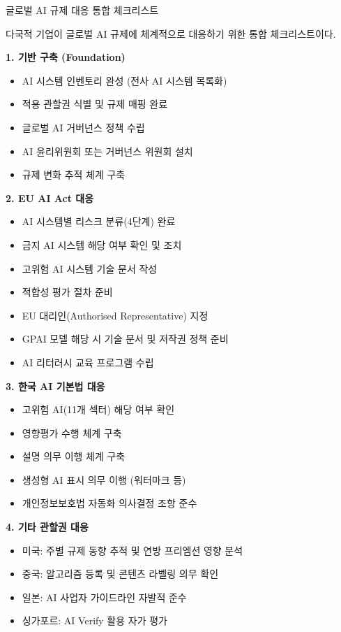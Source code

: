 \begin{practicaltool}{글로벌 AI 규제 대응 통합 체크리스트}

다국적 기업이 글로벌 AI 규제에 체계적으로 대응하기 위한 통합 체크리스트이다.

\textbf{1. 기반 구축 (Foundation)}
\begin{itemize}
 \item[$\square$] AI 시스템 인벤토리 완성 (전사 AI 시스템 목록화)
 \item[$\square$] 적용 관할권 식별 및 규제 매핑 완료
 \item[$\square$] 글로벌 AI 거버넌스 정책 수립
 \item[$\square$] AI 윤리위원회 또는 거버넌스 위원회 설치
 \item[$\square$] 규제 변화 추적 체계 구축
\end{itemize}

\textbf{2. EU AI Act 대응}
\begin{itemize}
 \item[$\square$] AI 시스템별 리스크 분류(4단계) 완료
 \item[$\square$] 금지 AI 시스템 해당 여부 확인 및 조치
 \item[$\square$] 고위험 AI 시스템 기술 문서 작성
 \item[$\square$] 적합성 평가 절차 준비
 \item[$\square$] EU 대리인(Authorised Representative) 지정
 \item[$\square$] GPAI 모델 해당 시 기술 문서 및 저작권 정책 준비
 \item[$\square$] AI 리터러시 교육 프로그램 수립
\end{itemize}

\textbf{3. 한국 AI 기본법 대응}
\begin{itemize}
 \item[$\square$] 고위험 AI(11개 섹터) 해당 여부 확인
 \item[$\square$] 영향평가 수행 체계 구축
 \item[$\square$] 설명 의무 이행 체계 구축
 \item[$\square$] 생성형 AI 표시 의무 이행 (워터마크 등)
 \item[$\square$] 개인정보보호법 자동화 의사결정 조항 준수
\end{itemize}

\textbf{4. 기타 관할권 대응}
\begin{itemize}
 \item[$\square$] 미국: 주별 규제 동향 추적 및 연방 프리엠션 영향 분석
 \item[$\square$] 중국: 알고리즘 등록 및 콘텐츠 라벨링 의무 확인
 \item[$\square$] 일본: AI 사업자 가이드라인 자발적 준수
 \item[$\square$] 싱가포르: AI Verify 활용 자가 평가
\end{itemize}


\end{practicaltool}
